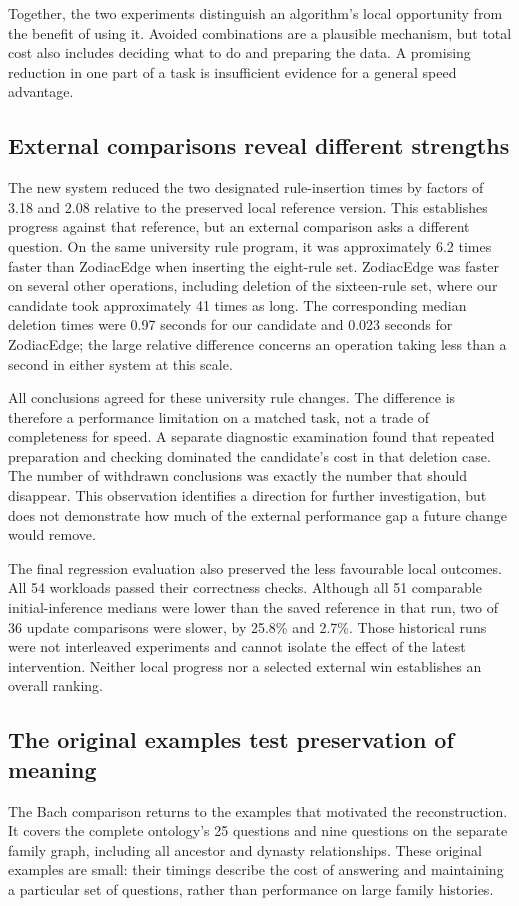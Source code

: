 \documentclass{article}
\begin{document}
Together, the two experiments distinguish an algorithm's local opportunity
from the benefit of using it. Avoided combinations are a plausible mechanism,
but total cost also includes deciding what to do and preparing the data.
A promising reduction in one part of a task is insufficient evidence for a
general speed advantage.

\subsection{External comparisons reveal different strengths}
The new system reduced the two designated rule-insertion times by factors of
3.18 and 2.08 relative to the preserved local reference version. This establishes
progress against that reference, but an external comparison asks a different
question. On the same university rule program, it was approximately 6.2 times
faster than ZodiacEdge when inserting the eight-rule set. ZodiacEdge was
faster on several other operations, including deletion of the sixteen-rule set,
where our candidate took approximately 41 times as long. The corresponding
median deletion times were 0.97 seconds for our candidate and 0.023 seconds
for ZodiacEdge; the large relative difference concerns an operation taking
less than a second in either system at this scale.

All conclusions agreed for these university rule changes. The difference is therefore a performance
limitation on a matched task, not a trade of completeness for speed. A separate
diagnostic examination found that repeated preparation and checking dominated
the candidate's cost in that deletion case. The number of withdrawn
conclusions was exactly the number that should disappear. This observation
identifies a direction for further investigation, but does not demonstrate
how much of the external performance gap a future change would remove.

The final regression evaluation also preserved the less favourable local
outcomes. All 54 workloads passed their correctness checks. Although all 51
comparable initial-inference medians were lower than the saved reference in
that run, two of 36 update comparisons were slower, by 25.8\% and 2.7\%.
Those historical runs were not interleaved experiments and cannot isolate the
effect of the latest intervention. Neither local progress nor a selected
external win establishes an overall ranking.

\subsection{The original examples test preservation of meaning}
The Bach comparison returns to the examples that motivated the reconstruction.
It covers the complete ontology's 25 questions and nine questions on the
separate family graph, including all ancestor and dynasty relationships.
These original examples are small: their timings describe the cost of answering
and maintaining a particular set of questions, rather than performance on
large family histories.
\end{document}
